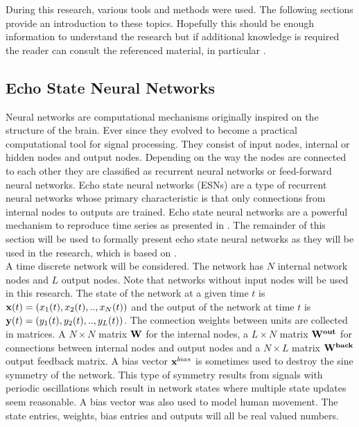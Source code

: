 \documentclass[letterpaper,9pt]{article}
\begin{document}
During this research, various tools and methods were used. The following sections provide an introduction to these topics. Hopefully this should be enough information to understand the research but if additional knowledge is required the reader can consult the referenced material, in particular \cite{JaegerESNTutorial}.

\subsection{Echo State Neural Networks}

Neural networks are computational mechanisms originally inspired on the structure of the brain. Ever since they evolved to become a practical computational tool for signal processing. They consist of input nodes, internal or hidden nodes and output nodes. Depending on the way the nodes are connected to each other they are classified as recurrent neural networks or feed-forward neural networks. Echo state neural networks (ESNs) are a type of recurrent neural networks whose primary characteristic is that only connections from internal nodes to outputs are trained. Echo state neural networks are a powerful mechanism to reproduce time series as presented in \cite{JaegerESNTutorial}. The remainder of this section will be used to formally present echo state neural networks as they will be used in the research, which is based on \cite{JaegerESNTutorial,ESNVerstraeten}.\\

A time discrete network will be considered. The network has $N$ internal network nodes and $L$ output nodes. Note that networks without input nodes will be used in this research. The state of the network at a given time $t$ is ${\bf x}(t)=(x_1(t),x_2(t),..,x_N(t))$ and the output of the network at time $t$ is ${\bf y}(t)=(y_1(t),y_2(t),..,y_L(t))$. The connection weights between units are collected in matrices. A  $N \times N$ matrix ${\bf W}$ for the internal nodes, a $L \times N$ matrix ${\bf W^{out}}$ for connections between internal nodes and output nodes and a $N \times L$ matrix ${\bf W^{back}}$ output feedback matrix. A bias vector ${\bf x}^{bias}$ is sometimes used to destroy the sine symmetry of the network. This type of symmetry results from signals with periodic oscillations which result in network states where multiple state updates seem reasonable. A bias vector was also used \cite{GentHumanMotion} to model human movement. The state entries, weights, bias entries and outputs will all be real valued numbers.\\
\end{document}
